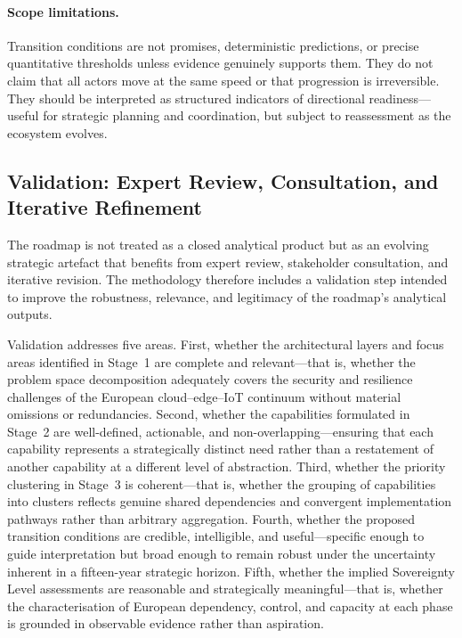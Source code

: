 \paragraph{Scope limitations.}
Transition conditions are not promises, deterministic predictions, or precise quantitative thresholds unless evidence genuinely supports them. They do not claim that all actors move at the same speed or that progression is irreversible. They should be interpreted as structured indicators of directional readiness---useful for strategic planning and coordination, but subject to reassessment as the ecosystem evolves.


\subsection{Validation: Expert Review, Consultation, and Iterative Refinement}
\label{sec:meth-validation}

The roadmap is not treated as a closed analytical product but as an evolving strategic artefact that benefits from expert review, stakeholder consultation, and iterative revision. The methodology therefore includes a validation step intended to improve the robustness, relevance, and legitimacy of the roadmap's analytical outputs.

Validation addresses five areas. First, whether the architectural layers and focus areas identified in Stage~1 are complete and relevant---that is, whether the problem space decomposition adequately covers the security and resilience challenges of the European cloud--edge--IoT continuum without material omissions or redundancies. Second, whether the capabilities formulated in Stage~2 are well-defined, actionable, and non-overlapping---ensuring that each capability represents a strategically distinct need rather than a restatement of another capability at a different level of abstraction. Third, whether the priority clustering in Stage~3 is coherent---that is, whether the grouping of capabilities into clusters reflects genuine shared dependencies and convergent implementation pathways rather than arbitrary aggregation. Fourth, whether the proposed transition conditions are credible, intelligible, and useful---specific enough to guide interpretation but broad enough to remain robust under the uncertainty inherent in a fifteen-year strategic horizon. Fifth, whether the implied Sovereignty Level assessments are reasonable and strategically meaningful---that is, whether the characterisation of European dependency, control, and capacity at each phase is grounded in observable evidence rather than aspiration.

